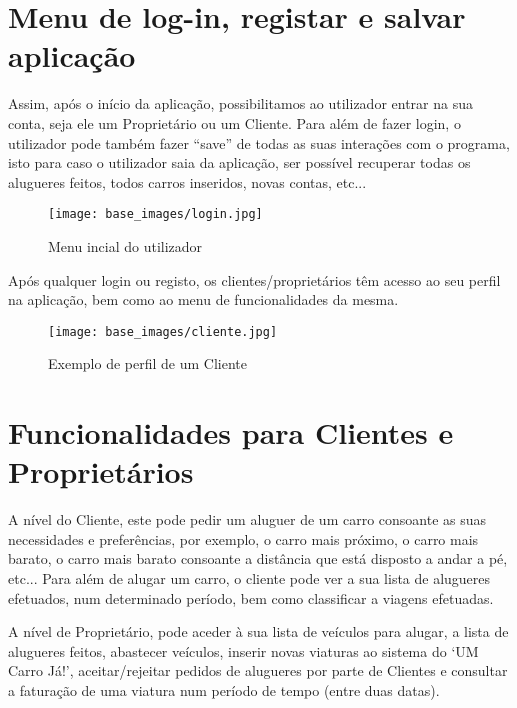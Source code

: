 \documentclass[a4paper,11pt]{report}
\begin{document}
\section{Menu de log-in, registar e salvar aplicação}

\hspace{0.5cm}Assim, após o início da aplicação, possibilitamos ao utilizador entrar na sua conta, seja ele um Proprietário ou um Cliente. Para além de fazer login, o utilizador pode também fazer “save” de todas as suas interações com o programa, isto para caso o utilizador saia da aplicação, ser possível recuperar todas os alugueres feitos, todos carros inseridos, novas contas, etc...

   \begin{figure}[H]
    \vspace{0.5cm}
        \centering
        \texttt{[image: base\_images/login.jpg]}
        \label{img:logo}
        \caption{Menu incial do utilizador}
    \end{figure}
Após qualquer login ou registo, os clientes/proprietários têm acesso ao seu perfil na aplicação, bem como ao menu de funcionalidades da mesma.
   \begin{figure}[H]
        \centering
        \texttt{[image: base\_images/cliente.jpg]}
        \label{img:logo}
        \caption{Exemplo de perfil de um Cliente}
    \end{figure}

\section{Funcionalidades para Clientes e Proprietários}
A nível do Cliente, este pode pedir um aluguer de um carro consoante as suas necessidades e preferências, por exemplo, o carro mais próximo, o carro mais barato, o carro mais barato consoante a distância que está disposto a andar a pé, etc...
Para além de alugar um carro, o cliente pode ver a sua lista de alugueres efetuados, num determinado período, bem como classificar a viagens efetuadas.

\vspace{0.5cm}

A nível de Proprietário, pode aceder à sua lista de veículos para alugar, a lista de alugueres feitos, abastecer veículos, inserir novas viaturas ao sistema do ‘UM Carro Já!’, aceitar/rejeitar pedidos de alugueres por parte de Clientes e consultar a faturação de uma viatura num período de tempo (entre duas datas).
\end{document}
